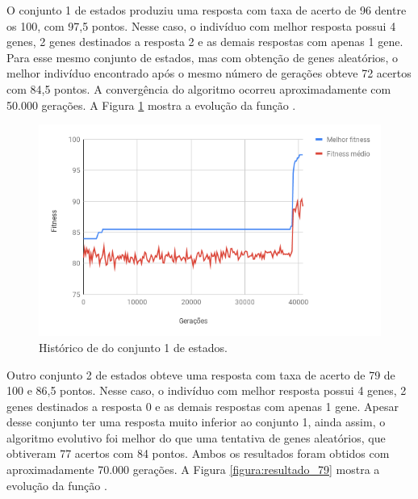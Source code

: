 O conjunto 1 de estados produziu uma resposta com taxa de acerto de 96 dentre os 100, com 97,5 pontos. Nesse caso, o indivíduo com melhor resposta possui 4 genes, 2 genes destinados a resposta 2 e as demais respostas com apenas 1 gene. Para esse mesmo conjunto de estados, mas com obtenção de genes aleatórios, o melhor indivíduo encontrado após o mesmo número de gerações obteve 72 acertos com 84,5 pontos. A convergência do algoritmo ocorreu aproximadamente com 50.000 gerações. A Figura \ref{figura:resultado_97} mostra a evolução da função \fitness.

\begin{figure}[htb]
    \caption{Histórico de \fitness do conjunto 1 de estados.}
    \label{figura:resultado_97}
    \centering
    \includegraphics[scale=0.8]{images/resultado_97}
    \fautor
\end{figure}

Outro conjunto 2 de estados obteve uma resposta com taxa de acerto de 79 de 100 e 86,5 pontos. Nesse caso, o indivíduo com melhor resposta possui 4 genes, 2 genes destinados a resposta 0 e as demais respostas com apenas 1 gene. Apesar desse conjunto ter uma resposta muito inferior ao conjunto 1, ainda assim, o algoritmo evolutivo foi melhor do que uma tentativa de genes aleatórios, que obtiveram 77 acertos com 84 pontos. Ambos os resultados foram obtidos com aproximadamente 70.000 gerações. A Figura \ref{figura:resultado_79} mostra a evolução da função \fitness.

